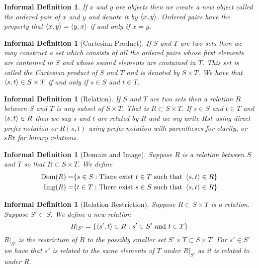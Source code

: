\documentclass[12pt]{article}
\theoremstyle{break}
\theoremstyle{break}
\theoremstyle{break}
\theoremstyle{break}
\theoremstyle{break}
\newtheorem{informal definition}[definition]{Informal Definition}
\theoremstyle{break}
\newtheorem{informal theorem}[theorem]{Informal Theorem}
\begin{document}
	\begin{informal definition}
		If $x$ and $y$ are objects then we create a new object called the ordered pair of $x$ and $y$ and denote it by $\braket{x, y}$.
		Ordered pairs have the property that $\braket{x, y} = \braket{y, x}$ if and only if $x = y$.
	\end{informal definition}
	
	\begin{informal definition}[Cartesian Product]
		If $S$ and $T$ are two sets then we may construct a set which consists of all the ordered pairs whose first elements are contained in $S$ and whose second elements are contained in $T$.
		This set is called the Cartesian product of $S$ and $T$ and is denoted by $S\times T$.
		We have that $\braket{s, t} \in S\times T$ if and only if $s\in S$ and $t \in T$.
	\end{informal definition}
	
	\begin{informal definition}[Relation]
		If $S$ and $T$ are two sets then a relation $R$ between $S$ and $T$ is any subset of $S\times T$.
		That is $R \subset S \times T$.
		If $s\in S$ and $t\in T$ and $\braket{s, t} \in R$ then we say $s$ and $t$ are related by $R$ and we my write $Rst$ using direct prefix notation or $R(s, t)$ using prefix notation with parentheses for clarity, or $sRt$ for binary relations.
	\end{informal definition}
	
	\begin{informal definition}[Domain and Image]
		Suppose $R$ is a relation between $S$ and $T$ so that $R\subset S \times T$.
		We define
		\begin{align*}
			\text{Dom}(R) =& \{s \in S: \text{There exist } t \in T \text{ such that } \braket{s, t} \in R\}\\
			\text{Img}(R) =& \{t \in T: \text{There exist } s \in S \text{ such that } \braket{s, t} \in R\}
		\end{align*}
	\end{informal definition}
	
	\begin{informal definition}[Relation Restriction]
		Suppose $R\subset S \times T$ is a relation.
		Suppose $S' \subset S$.
		We define a new relation
		$$
		R|_{S'} = \{\braket{s', t} \in R: s' \in S' \text{ and } t\in T\}
		$$
		$R|_{S'}$ is the restriction of $R$ to the possibly smaller set $S' \times T \subset S \times T$.
		For $s' \in S'$ we have that $s'$ is related to the same elements of $T$ under $R|_{S'}$ as it is related to under $R$.
	\end{informal definition}
	
\end{document}
